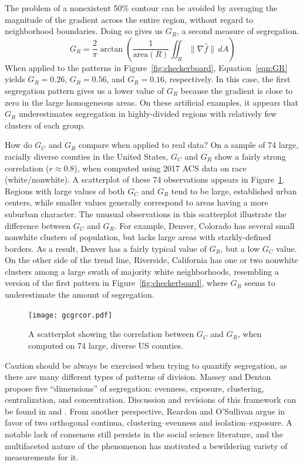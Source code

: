 \documentclass{article}
\theoremstyle{theorem}
\theoremstyle{definition}
\begin{document}
The problem of a nonexistent 50\% contour can be avoided by averaging the magnitude of the gradient across the entire region, without regard to neighborhood boundaries. Doing so gives us $G_R$, a second measure of segregation.
\begin{equation}\label{eqn:GR}
   G_R = \frac{2}{\pi} \arctan \left(\frac{1}{\mathrm{area}(R)} \iint_R \lVert \nabla \hat{f} \rVert \, dA \right)
\end{equation}
When applied to the patterns in Figure~\ref{fig:checkerboard}, Equation~\ref{eqn:GR} yields $G_R = 0.26$, $G_R = 0.56$, and $G_R = 0.16$, respectively. In this case, the first segregation pattern gives us a lower value of $G_R$ because the gradient is close to zero in the large homogeneous areas. On these artificial examples, it appears that $G_R$ underestimates segregation in highly-divided regions with relatively few clusters of each group.

How do $G_C$ and $G_R$ compare when applied to real data? On a sample of 74 large, racially diverse counties in the United States, $G_C$ and $G_R$ show a fairly strong correlation ($r \approx 0.8$), when computed using 2017 ACS data on race (white/nonwhite). A scatterplot of these 74 observations appears in Figure~\ref{fig:gcgrcor}. Regions with large values of both $G_C$ and $G_R$ tend to be large, established urban centers, while smaller values generally correspond to areas having a more suburban character. The unusual observations in this scatterplot illustrate the difference between $G_C$ and $G_R$. For example, Denver, Colorado has several small nonwhite clusters of population, but lacks large areas with starkly-defined borders. As a result, Denver has a fairly typical value of $G_R$, but a low $G_C$ value. On the other side of the trend line, Riverside, California has one or two nonwhite clusters among a large swath of majority white neighborhoods, resembling a version of the first pattern in Figure~\ref{fig:checkerboard}, where $G_R$ seems to underestimate the amount of segregation.

\begin{figure}[t!]
  \texttt{[image: gcgrcor.pdf]}
  \caption{A scatterplot showing the correlation between $G_C$ and $G_R$, when computed on 74 large, diverse US counties.}
  \label{fig:gcgrcor}
\end{figure}

Caution should be always be exercised when trying to quantify segregation, as there are many different types of patterns of division. Massey and Denton \cite{masseydenton88}  propose five ``dimensions'' of segregation: evenness, exposure, clustering, centralization, and concentration. Discussion and revisions of this framework can be found in \cite{johnston07} and \cite{brownchung06}. From another perspective, Reardon and O'Sullivan \cite{reardonosullivan04} argue in favor of two orthogonal continua, clustering--evenness and isolation--exposure. A notable lack of consensus still persists in the social science literature, and the multifaceted nature of the phenomenon has motivated a bewildering variety of measurements for it. \cite{harrisjohnson18}
\end{document}
